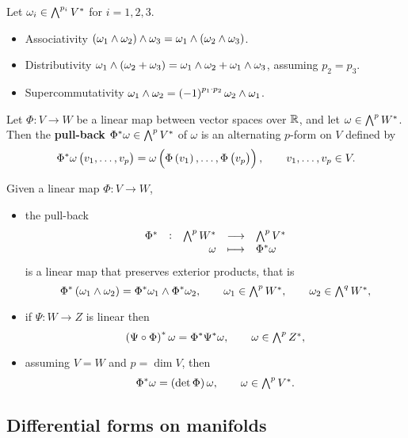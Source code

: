 \begin{proposition}
\label{prop:1.6}
Let $ \omega_i \in \textstyle\bigwedge^{p_i}V^* $ for $ i = 1, 2, 3 $.
\begin{itemize}
\item Associativity $ \br{\omega_1 \wedge \omega_2} \wedge \omega_3 = \omega_1 \wedge \br{\omega_2 \wedge \omega_3} $.
\item Distributivity $ \omega_1 \wedge \br{\omega_2 + \omega_3} = \omega_1 \wedge \omega_2 + \omega_1 \wedge \omega_3 $, assuming $ p_2 = p_3 $.
\item Supercommutativity $ \omega_1 \wedge \omega_2 = \br{-1}^{p_1 \cdot p_2}\omega_2 \wedge \omega_1 $.
\end{itemize}
\end{proposition}

\begin{definition}
Let $ \Phi : V \to W $ be a linear map between vector spaces over $ \mathbb{R} $, and let $ \omega \in \textstyle\bigwedge^pW^* $. Then the \textbf{pull-back} $ \Phi^*\omega \in \textstyle\bigwedge^pV^* $ of $ \omega $ is an alternating $ p $-form on $ V $ defined by
$$ \Phi^*\omega\br{v_1, \dots, v_p} = \omega\br{\Phi\br{v_1}, \dots, \Phi\br{v_p}}, \qquad v_1, \dots, v_p \in V. $$
\end{definition}

\pagebreak

\begin{proposition}
\label{prop:1.8}
Given a linear map $ \Phi : V \to W $,
\begin{itemize}
\item the pull-back
$$ \function[\Phi^*]{\ext^pW^*}{\ext^pV^*}{\omega}{\Phi^*\omega} $$
is a linear map that preserves exterior products, that is
$$ \Phi^*\br{\omega_1 \wedge \omega_2} = \Phi^*\omega_1 \wedge \Phi^*\omega_2, \qquad \omega_1 \in \ext^pW^*, \qquad \omega_2 \in \ext^qW^*, $$
\item if $ \Psi : W \to Z $ is linear then
$$ \br{\Psi \circ \Phi}^*\omega = \Phi^*\Psi^*\omega, \qquad \omega \in \ext^pZ^*, $$
\item assuming $ V = W $ and $ p = \dim V $, then
$$ \Phi^*\omega = \br{\det \Phi}\omega, \qquad \omega \in \ext^pV^*. $$
\end{itemize}
\end{proposition}

\subsection{Differential forms on manifolds}


